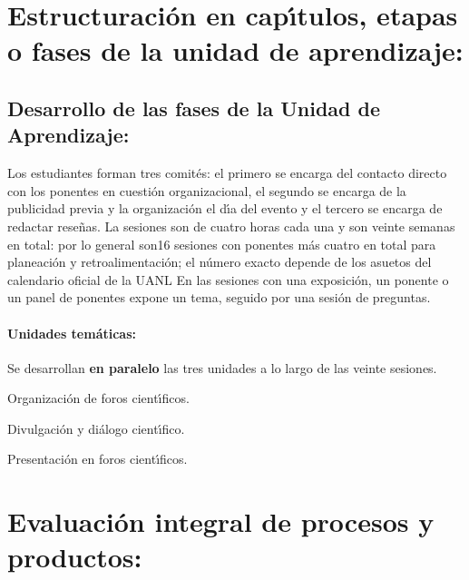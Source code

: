 \section{Estructuraci\'{o}n en cap\'{\i}tulos, etapas o fases de la unidad de
  aprendizaje:}

\subsection{Desarrollo de las fases de la Unidad de Aprendizaje:}

\quad

Los estudiantes forman tres comit\'{e}s: el primero se encarga del
contacto directo con los ponentes en cuesti\'{o}n organizacional, el
segundo se encarga de la publicidad previa y la organizaci\'{o}n el
d\'{\i}a del evento y el tercero se encarga de redactar rese\~{n}as.
La sesiones son de cuatro horas cada una y son veinte semanas en
total: por lo general son16 sesiones con ponentes m\'{a}s cuatro en
total para planeaci\'{o}n y retroalimentaci\'{o}n; el n\'{u}mero exacto
depende de los asuetos del calendario oficial de la UANL En las
sesiones con una exposici\'{o}n, un ponente o un panel de ponentes
expone un tema, seguido por una sesi\'{o}n de preguntas.

\paragraph{Unidades tem\'{a}ticas:}

\quad

Se desarrollan {\bf en paralelo} las tres unidades a lo largo de las
veinte sesiones. 

\begin{description}[itemsep=-2pt]
\item[U1]{Organizaci\'{o}n de foros cient\'{\i}ficos.}
\item[U2]{Divulgaci\'{o}n y di\'{a}logo cient\'{\i}fico.}
\item[U3]{Presentaci\'{o}n en foros cient\'{\i}ficos.}
\end{description}





\newpage





\newpage

\section{Evaluaci\'{o}n integral de procesos y productos:}


